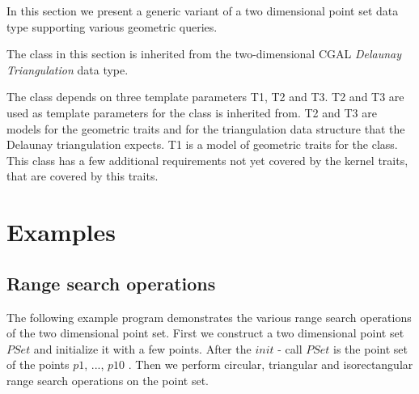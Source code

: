 In this section we present a generic variant of a two dimensional point set
data type supporting various geometric queries.

The  class in this section is inherited
from the two-dimensional CGAL {\em Delaunay Triangulation} data type.

The  class depends on three template parameters T1, T2 and T3.
T2 and T3 are used as template parameters for the 
class  is inherited from. T2 and T3 are models for the
geometric traits and for the triangulation data structure that the Delaunay triangulation
expects.
T1 is a model of geometric traits for the  class.
This class has a few additional requirements not yet covered by the kernel traits, that
are covered by this traits.

\section{Examples}

\subsection{Range search operations}

The following example program demonstrates the various range search operations
of the two dimensional point set.
First we construct a two dimensional point set $PSet$ and initialize it with a few points.
After the $init$ - call $PSet$ is the point set of the points $p1$, ..., $p10$ .
Then we perform circular, triangular and isorectangular range search operations on the
point set.

\ccHtmlLinksOff

